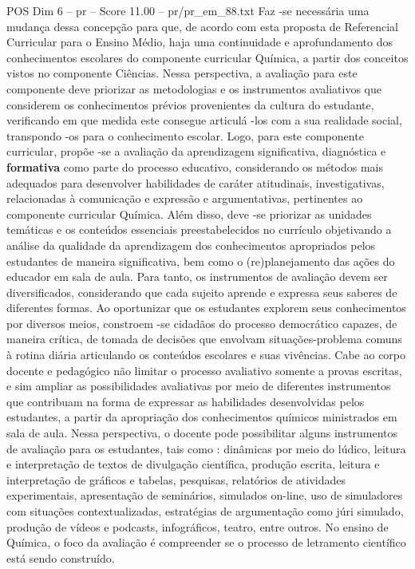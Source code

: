 \begin{textsample}{POS Dim 6 – pr – Score 11.00 – pr/pr\_em\_88.txt}
Faz -se necessária uma mudança dessa concepção para que, de acordo com esta proposta de Referencial Curricular para o Ensino Médio, haja uma continuidade e aprofundamento dos conhecimentos escolares do componente curricular Química, a partir dos conceitos vistos no componente Ciências.
Nessa perspectiva, a avaliação para este componente deve priorizar as metodologias e os instrumentos avaliativos que considerem os conhecimentos prévios provenientes da cultura do estudante, verificando em que medida este consegue articulá -los com a sua realidade social, transpondo -os para o conhecimento escolar.
Logo, para este componente curricular, propõe -se a avaliação da aprendizagem significativa, diagnóstica e \textbf{formativa} como parte do processo educativo, considerando os métodos mais adequados para desenvolver habilidades de caráter atitudinais, investigativas, relacionadas à comunicação e expressão e argumentativas, pertinentes ao componente curricular Química.
Além disso, deve -se priorizar as unidades temáticas e os conteúdos essenciais preestabelecidos no currículo objetivando a análise da qualidade da aprendizagem dos conhecimentos apropriados pelos estudantes de maneira significativa, bem como o (re)planejamento das ações do educador em sala de aula.
Para tanto, os instrumentos de avaliação devem ser diversificados, considerando que cada sujeito aprende e expressa seus saberes de diferentes formas.
Ao oportunizar que os estudantes explorem seus conhecimentos por diversos meios, constroem -se cidadãos do processo democrático capazes, de maneira crítica, de tomada de decisões que envolvam situações-problema comuns à rotina diária articulando os conteúdos escolares e suas vivências.
Cabe ao corpo docente e pedagógico não limitar o processo avaliativo somente a provas escritas, e sim ampliar as possibilidades avaliativas por meio de diferentes instrumentos que contribuam na forma de expressar as habilidades desenvolvidas pelos estudantes, a partir da apropriação dos conhecimentos químicos ministrados em sala de aula.
Nessa perspectiva, o docente pode possibilitar alguns instrumentos de avaliação para os estudantes, tais como : dinâmicas por meio do lúdico, leitura e interpretação de textos de divulgação científica, produção escrita, leitura e interpretação de gráficos e tabelas, pesquisas, relatórios de atividades experimentais, apresentação de seminários, simulados on-line, uso de simuladores com situações contextualizadas, estratégias de argumentação como júri simulado, produção de vídeos e podcasts, infográficos, teatro, entre outros.
No ensino de Química, o foco da avaliação é compreender se o processo de letramento científico está sendo construído.

\end{textsample}

